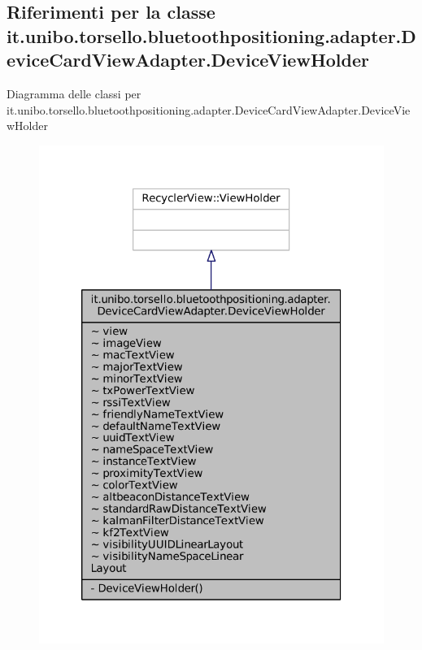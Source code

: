 \hypertarget{classit_1_1unibo_1_1torsello_1_1bluetoothpositioning_1_1adapter_1_1DeviceCardViewAdapter_1_1DeviceViewHolder}{}\subsection{Riferimenti per la classe it.\+unibo.\+torsello.\+bluetoothpositioning.\+adapter.\+Device\+Card\+View\+Adapter.\+Device\+View\+Holder}
\label{classit_1_1unibo_1_1torsello_1_1bluetoothpositioning_1_1adapter_1_1DeviceCardViewAdapter_1_1DeviceViewHolder}


Diagramma delle classi per it.\+unibo.\+torsello.\+bluetoothpositioning.\+adapter.\+Device\+Card\+View\+Adapter.\+Device\+View\+Holder
\nopagebreak
\begin{figure}[H]
\begin{center}
\leavevmode
\includegraphics[width=320pt]{classit_1_1unibo_1_1torsello_1_1bluetoothpositioning_1_1adapter_1_1DeviceCardViewAdapter_1_1DeviceViewHolder__inherit__graph}
\end{center}
\end{figure}


